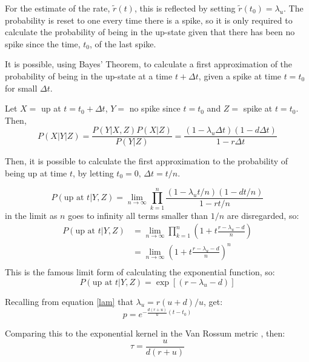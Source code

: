 For the estimate of the rate, $\tilde{r}(t)$, this is reflected by setting $\tilde{r}(t_0) = \lambda_u$.  The probability is reset  to one every time there is a spike, so it is only required to calculate the probability of being in the up-state given that there has been no spike since the time, $t_0$, of the last spike.  

It is possible, using Bayes' Theorem, to calculate a first approximation of the probability of being in the up-state at a time $t+\Delta t$, given a spike at time $t=t_0$ for small $\Delta t$.

 Let $X=$ up at $t=t_0+\Delta t$, $Y=$ no spike since $t=t_0$ and $Z=$ spike at $t=t_0$. Then,
\begin{equation}\label{p}
P(X|Y|Z) = \frac{P(Y|X,Z)P(X|Z)}{P(Y|Z)} = \frac{(1-\lambda_u \Delta t) (1-d \Delta t)}{1-r\Delta t}
\end{equation}

Then, it is possible to calculate the first approximation to the probability  of being up at time $t$, by letting $t_0=0, \,\Delta t =t/n$.

\begin{equation}
P(\mbox{up at } t | Y , Z)   =  \lim_{n \rightarrow \infty}\prod_{k=1}^n \frac{(1-\lambda_ut/n)(1-dt/n)}{1-rt/n}
\end{equation} 
in the limit as $n$ goes to infinity all terms smaller than $1/n$ are disregarded, so:
\begin{equation}
\begin{split}
P(\mbox{up at } t | Y , Z) &= \lim_{n \rightarrow \infty} \prod_{k=1}^n \left(1+ t\frac{r-\lambda_u-d}{n}\right) \\
& = \lim_{n \rightarrow \infty} \left(1 + t\frac{r-\lambda_u -d}{n} \right)^n \\
\end{split}
\end{equation}
This is the famous limit form of calculating the exponential function, so:
\begin{equation}
P(\mbox{up at } t | Y,Z) = \exp [ (r-\lambda_u-d) ]
\end{equation} 

Recalling from equation \ref{lam} that $\lambda_u = r(u+d)/u$, get:
\begin{equation}
p=e^{-\frac{d(r+u)}{u}(t-t_0)}
\end{equation}

Comparing this to the exponential kernel in the Van Rossum metric \citep{VanRossum2001a}, then:
\begin{equation}
\tau = \frac{u}{d(r+u)}
\end{equation}

